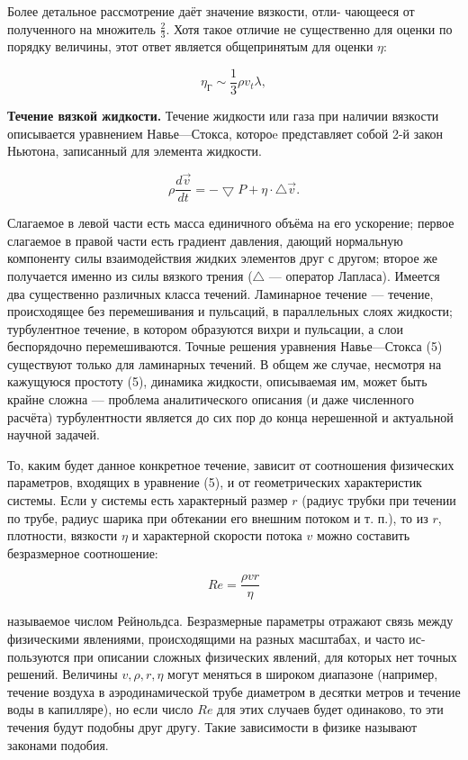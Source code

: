 \documentclass{article}
\begin{document}
Более детальное рассмотрение даёт значение вязкости, отли-
чающееся от полученного на множитель $\frac{2}{3}$. Хотя такое отличие не существенно для оценки по порядку величины, этот ответ является общепринятым для оценки $\eta$:

\begin{equation}
        \eta_{Г} \sim \frac{1}{3} \rho v_t \lambda, 
\end{equation}

\textbf{Течение вязкой жидкости.} Течение жидкости или газа при наличии вязкости описывается уравнением Навье—Стокса, котороe представляет собой 2-й закон Ньютона, записанный для элемента жидкости.

\begin{equation}
        \rho \frac{d \vec{v}}{d t} = - \bigtriangledown P + \eta \cdot \bigtriangleup \vec{v}.
\end{equation}

Слагаемое в левой части есть масса единичного объёма на его ускорение; первое слагаемое в правой части есть градиент давления, дающий нормальную компоненту силы взаимодействия жидких элементов друг с другом; второе же получается именно из силы вязкого трения ($\bigtriangleup$ — оператор Лапласа). Имеется два существенно различных класса течений. Ламинарное течение — течение, происходящее без перемешивания и пульсаций, в параллельных слоях жидкости; турбулентное течение, в котором образуются вихри и пульсации, а слои беспорядочно перемешиваются. Точные решения уравнения Навье—Стокса (5) существуют только для ламинарных течений. В общем же случае, несмотря на кажущуюся простоту (5), динамика жидкости, описываемая им, может быть крайне сложна — проблема аналитического описания (и даже численного расчёта) турбулентности является до сих пор до конца нерешенной и актуальной научной задачей.


То, каким будет данное конкретное течение, зависит от соотношения физических параметров, входящих в уравнение (5), и от геометрических характеристик системы. Если у системы есть характерный размер $r$ (радиус трубки при течении по трубе, радиус шарика при обтекании его внешним потоком и т. п.), то из $r$, плотности, вязкости $\eta$ и характерной скорости потока $v$ можно составить безразмерное соотношение:

\begin{equation}
        Re = \frac{\rho v r}{\eta}
\end{equation}
 
называемое числом Рейнольдса.
Безразмерные параметры отражают связь между физическими явлениями, происходящими на разных масштабах, и часто ис-
пользуются при описании сложных физических явлений, для которых нет точных решений. Величины $v, \rho, r, \eta$ могут меняться в широком диапазоне (например, течение воздуха в аэродинамической трубе диаметром в десятки метров и течение воды в капилляре), но если число $Re$ для этих случаев будет одинаково, то эти течения будут подобны друг другу. Такие зависимости в физике называют законами подобия.
\end{document}
